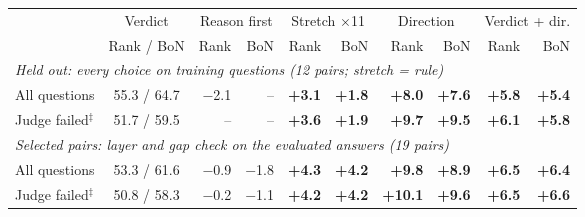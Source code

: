 \begin{tabular}{l c rr rr rr rr}
\toprule
& Verdict & \multicolumn{2}{c}{Reason first} & \multicolumn{2}{c}{Stretch $\times$11} & \multicolumn{2}{c}{Direction} & \multicolumn{2}{c}{Verdict + dir.} \\
\cmidrule(lr){3-4}\cmidrule(lr){5-6}\cmidrule(lr){7-8}\cmidrule(l){9-10}
& Rank / BoN & Rank & BoN & Rank & BoN & Rank & BoN & Rank & BoN \\
\midrule
\multicolumn{10}{l}{\emph{Held out: every choice on training questions (12 pairs; stretch = rule)}} \\
\quad All questions & 55.3 / 64.7 & $-$2.1 & -- & \textbf{+3.1} & \textbf{+1.8} & \textbf{+8.0} & \textbf{+7.6} & \textbf{+5.8} & \textbf{+5.4} \\
\quad Judge failed$^\ddagger$ & 51.7 / 59.5 & -- & -- & \textbf{+3.6} & \textbf{+1.9} & \textbf{+9.7} & \textbf{+9.5} & \textbf{+6.1} & \textbf{+5.8} \\
\midrule
\multicolumn{10}{l}{\emph{Selected pairs: layer and gap check on the evaluated answers (19 pairs)}} \\
\quad All questions & 53.3 / 61.6 & $-$0.9 & $-$1.8 & \textbf{+4.3} & \textbf{+4.2} & \textbf{+9.8} & \textbf{+8.9} & \textbf{+6.5} & \textbf{+6.4} \\
\quad Judge failed$^\ddagger$ & 50.8 / 58.3 & $-$0.2 & $-$1.1 & \textbf{+4.2} & \textbf{+4.2} & \textbf{+10.1} & \textbf{+9.6} & \textbf{+6.5} & \textbf{+6.6} \\
\bottomrule
\end{tabular}
